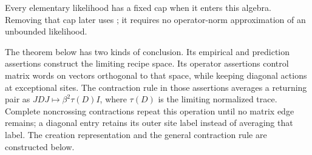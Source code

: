 Every elementary likelihood has a fixed cap when it enters this
algebra.  Removing that cap later uses ; it
requires no operator-norm approximation of an unbounded likelihood.

The theorem below has two kinds of conclusion.  Its empirical and
prediction assertions construct the limiting recipe space.  Its
operator assertions control matrix words on vectors orthogonal to
that space, while keeping diagonal actions at exceptional sites.
The contraction rule in those assertions averages a returning pair
as $JDJ\mapsto\beta^2\tau(D)I$, where $\tau(D)$ is the limiting
normalized trace.  Complete noncrossing contractions repeat this
operation until no matrix edge remains; a diagonal entry retains its
outer site label instead of averaging that label.  The creation
representation and the general contraction rule are constructed below.

